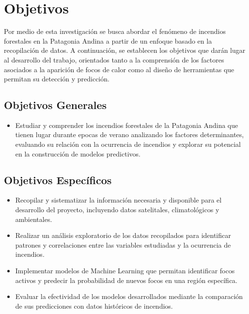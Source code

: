 \section{Objetivos}
Por medio de esta investigación se busca abordar el fenómeno de incendios forestales en la Patagonia Andina a partir de un enfoque basado en la recopilación de datos. A continuación, se establecen los objetivos que darán lugar al desarrollo del trabajo, orientados tanto a la comprensión de los factores asociados a la aparición de focos de calor como al diseño de herramientas que permitan su detección y predicción.

\subsection{Objetivos Generales}
\begin{itemize}
    \item Estudiar y comprender los incendios forestales de la Patagonia Andina que tienen lugar durante epocas de verano analizando los factores determinantes, evaluando su relación con la ocurrencia de incendios y explorar su potencial en la construcción de modelos predictivos.
\end{itemize}

\subsection{Objetivos Específicos}
\begin{itemize}
    \item Recopilar y sistematizar la información necesaria y disponible para el desarrollo del proyecto, incluyendo datos satelitales, climatológicos y ambientales.
    \item Realizar un análisis exploratorio de los datos recopilados para identificar patrones y correlaciones entre las variables estudiadas y la ocurrencia de incendios.
    \item Implementar modelos de Machine Learning que permitan identificar focos activos y predecir la probabilidad de nuevos focos en una región específica.
    \item Evaluar la efectividad de los modelos desarrollados mediante la comparación de sus predicciones con datos históricos de incendios.
\end{itemize}